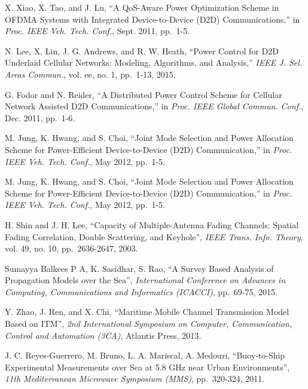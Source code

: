 \documentclass[conference]{IEEEtran}
\begin{document}
\begin{thebibliography}{10}
  
  
  X. Xiao, X. Tao, and J. Lu, ``A QoS-Aware Power Optimization Scheme in OFDMA Systems with Integrated Device-to-Device (D2D) Communications,'' in
  \emph{Proc. IEEE Veh. Tech. Conf.}, Sept. 2011, pp.~1-5.
  
  N. Lee, X. Lin, J. G. Andrews, and R. W. Heath, ``Power Control for D2D Underlaid Cellular Networks: Modeling, Algorithms, and Analysis,''
  \emph{IEEE J. Sel. Areas Commun.}, vol. ee, no. 1, pp.~1-13, 2015.

  G. Fodor and N. Reider, ``A Distributed Power Control Scheme for Cellular Network Assisted D2D Communications,'' in
  \emph{Proc. IEEE Global Commun. Conf.}, Dec. 2011, pp.~1-6.

  M. Jung, K. Hwang, and S. Choi, ``Joint Mode Selection and Power Allocation Scheme for Power-Efficient Device-to-Device (D2D) Communication,'' in
  \emph{Proc. IEEE Veh. Tech. Conf.}, May 2012, pp.~1-5.
  
  M. Jung, K. Hwang, and S. Choi, ``Joint Mode Selection and Power Allocation Scheme for Power-Efficient Device-to-Device (D2D) Communication,'' in
  \emph{Proc. IEEE Veh. Tech. Conf.}, May 2012, pp.~1-5.

  H. Shin and J. H. Lee, ``Capacity of Multiple-Antenna Fading Channels: Spatial Fading Correlation, Double Scattering, and Keyhole'',
  \emph{IEEE Trans. Info. Theory}, vol. 49, no. 10, pp.~2636-2647, 2003.

  Sumayya Balkees P A, K. Sasidhar, S. Rao, ``A Survey Based Analysis of Propagation Models over the Sea'',
  \emph{International Conference on Advances in Computing, Communications and Informatics (ICACCI)}, pp.~69-75, 2015.
  
  Y. Zhao, J. Ren, and X. Chi, ``Maritime Mobile Channel Transmission Model Based on ITM'',
  \emph{2nd International Symposium on Computer, Communication, Control and Automation (3CA)}, Atlantis Press, 2013.
  
  J. C. Reyes-Guerrero, M. Bruno, L. A. Mariscal, A. Medouri, ``Buoy-to-Ship Experimental Measurements over Sea at 5.8 GHz near Urban Environments'',
  \emph{11th Mediterranean Microwave Symposium (MMS)}, pp.~320-324, 2011.


\end{thebibliography}
\end{document}
